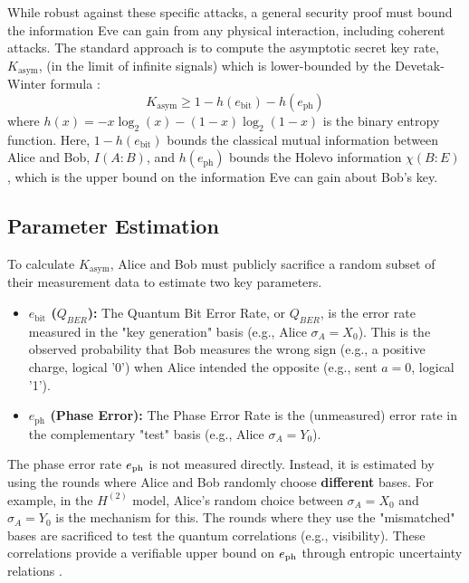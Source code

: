 While robust against these specific attacks, a general security proof must bound the information Eve can gain from any physical interaction, including coherent attacks. The standard approach \cite{Scarani2009} is to compute the asymptotic secret key rate, $K_{\text{asym}}$, (in the limit of infinite signals) which is lower-bounded by the Devetak-Winter formula \cite{Devetak2005}:
\begin{equation}
    K_{\text{asym}} \ge 1 - h(e_{\text{bit}}) - h(e_{\text{ph}})
\end{equation}
where $h(x) = -x \log_2(x) - (1-x) \log_2(1-x)$ is the binary entropy function. Here, $1 - h(e_{\text{bit}})$ bounds the classical mutual information between Alice and Bob, $I(A:B)$, and $h(e_{\text{ph}})$ bounds the Holevo information $\chi(B:E)$, which is the upper bound on the information Eve can gain about Bob's key.

\subsection{Parameter Estimation}
\label{sec:parameter_estimation}

To calculate $K_{\text{asym}}$, Alice and Bob must publicly sacrifice a random subset of their measurement data to estimate two key parameters.

\begin{itemize}
    \item \textbf{$e_{\text{bit}}$ ($Q_{BER}$):} The Quantum Bit Error Rate, or $Q_{BER}$, is the error rate measured in the "key generation" basis (e.g., Alice $\sigma_A=X_0$). This is the observed probability that Bob measures the wrong sign (e.g., a positive charge, logical '0') when Alice intended the opposite (e.g., sent $a=0$, logical '1').

    \item \textbf{$e_{\text{ph}}$ (Phase Error):} The Phase Error Rate is the (unmeasured) error rate in the complementary "test" basis (e.g., Alice $\sigma_A=Y_0$).
\end{itemize}

The phase error rate $e_{\rm ph}$ is not measured directly. Instead, it is estimated by using the rounds where Alice and Bob randomly choose \textbf{different} bases. For example, in the $H^{(2)}$ model, Alice's random choice between $\sigma_A=X_0$ and $\sigma_A=Y_0$ is the mechanism for this. The rounds where they use the "mismatched" bases are sacrificed to test the quantum correlations (e.g., visibility). These correlations provide a verifiable upper bound on $e_{\rm ph}$ through entropic uncertainty relations \cite{Tomamichel2011, Koashi2009}.


